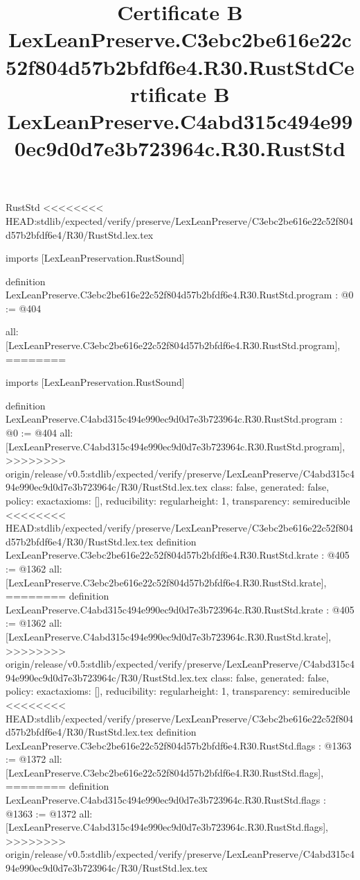 \begin{lexlean}{RustStd}
<<<<<<<< HEAD:stdlib/expected/verify/preserve/LexLeanPreserve/C3ebc2be616e22c52f804d57b2bfdf6e4/R30/RustStd.lex.tex
\title{Certificate B LexLeanPreserve.C3ebc2be616e22c52f804d57b2bfdf6e4.R30.RustStd}
\begin{coremodule}
imports [LexLeanPreservation.RustSound]

definition LexLeanPreserve.C3ebc2be616e22c52f804d57b2bfdf6e4.R30.RustStd.program : @0 := @404 {
  all: [LexLeanPreserve.C3ebc2be616e22c52f804d57b2bfdf6e4.R30.RustStd.program],
========
\title{Certificate B LexLeanPreserve.C4abd315c494e990ec9d0d7e3b723964c.R30.RustStd}
\begin{coremodule}
imports [LexLeanPreservation.RustSound]

definition LexLeanPreserve.C4abd315c494e990ec9d0d7e3b723964c.R30.RustStd.program : @0 := @404 {
  all: [LexLeanPreserve.C4abd315c494e990ec9d0d7e3b723964c.R30.RustStd.program],
>>>>>>>> origin/release/v0.5:stdlib/expected/verify/preserve/LexLeanPreserve/C4abd315c494e990ec9d0d7e3b723964c/R30/RustStd.lex.tex
  class: false,
  generated: false,
  policy: exact{axioms: []},
  reducibility: regular{height: 1},
  transparency: semireducible
}
<<<<<<<< HEAD:stdlib/expected/verify/preserve/LexLeanPreserve/C3ebc2be616e22c52f804d57b2bfdf6e4/R30/RustStd.lex.tex
definition LexLeanPreserve.C3ebc2be616e22c52f804d57b2bfdf6e4.R30.RustStd.krate : @405 := @1362 {
  all: [LexLeanPreserve.C3ebc2be616e22c52f804d57b2bfdf6e4.R30.RustStd.krate],
========
definition LexLeanPreserve.C4abd315c494e990ec9d0d7e3b723964c.R30.RustStd.krate : @405 := @1362 {
  all: [LexLeanPreserve.C4abd315c494e990ec9d0d7e3b723964c.R30.RustStd.krate],
>>>>>>>> origin/release/v0.5:stdlib/expected/verify/preserve/LexLeanPreserve/C4abd315c494e990ec9d0d7e3b723964c/R30/RustStd.lex.tex
  class: false,
  generated: false,
  policy: exact{axioms: []},
  reducibility: regular{height: 1},
  transparency: semireducible
}
<<<<<<<< HEAD:stdlib/expected/verify/preserve/LexLeanPreserve/C3ebc2be616e22c52f804d57b2bfdf6e4/R30/RustStd.lex.tex
definition LexLeanPreserve.C3ebc2be616e22c52f804d57b2bfdf6e4.R30.RustStd.flags : @1363 := @1372 {
  all: [LexLeanPreserve.C3ebc2be616e22c52f804d57b2bfdf6e4.R30.RustStd.flags],
========
definition LexLeanPreserve.C4abd315c494e990ec9d0d7e3b723964c.R30.RustStd.flags : @1363 := @1372 {
  all: [LexLeanPreserve.C4abd315c494e990ec9d0d7e3b723964c.R30.RustStd.flags],
>>>>>>>> origin/release/v0.5:stdlib/expected/verify/preserve/LexLeanPreserve/C4abd315c494e990ec9d0d7e3b723964c/R30/RustStd.lex.tex
}}}
\end{coremodule}}
\end{coremodule}
\end{lexlean}
